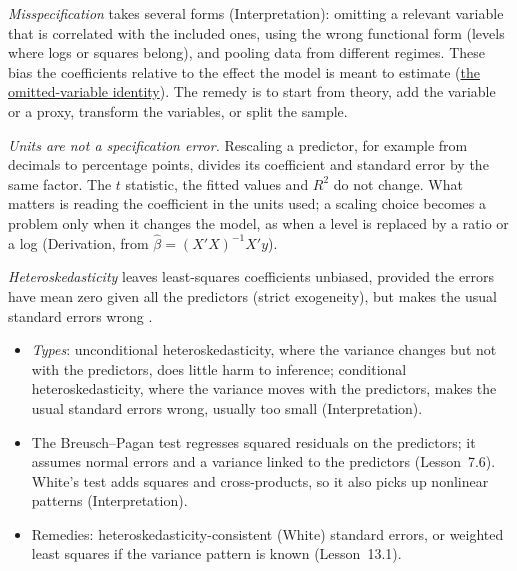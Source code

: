 \begin{qfmethod}\label{meth:regression-misspecification}
 \emph{Misspecification} takes several forms (Interpretation): omitting a relevant variable that is correlated with the included ones, using the wrong functional form (levels where logs or squares belong), and pooling data from different regimes. These bias the coefficients relative to the effect the model is meant to estimate (\hyperref[meth:multiple-regression-formulation]{the omitted-variable identity}). The remedy is to start from theory, add the variable or a proxy, transform the variables, or split the sample.

\emph{Units are not a specification error.} Rescaling a predictor, for example from decimals to percentage points, divides its coefficient and standard error by the same factor. The $t$ statistic, the fitted values and $R^2$ do not change. What matters is reading the coefficient in the units used; a scaling choice becomes a problem only when it changes the model, as when a level is replaced by a ratio or a log (Derivation, from $\hat\beta=(X'X)^{-1}X'y$).

\emph{Heteroskedasticity} leaves least-squares coefficients unbiased, provided the errors have mean zero given all the predictors (strict exogeneity), but makes the usual standard errors wrong \citep[Lessons~7.6, 13.1]{regression-methods-course-notes}.
\begin{itemize}
\item \emph{Types}: unconditional heteroskedasticity, where the variance changes but not with the predictors, does little harm to inference; conditional heteroskedasticity, where the variance moves with the predictors, makes the usual standard errors wrong, usually too small (Interpretation).
\item The Breusch--Pagan test regresses squared residuals on the predictors; it assumes normal errors and a variance linked to the predictors (Lesson~7.6). White's test adds squares and cross-products, so it also picks up nonlinear patterns (Interpretation).
\item Remedies: heteroskedasticity-consistent (White) standard errors, or weighted least squares if the variance pattern is known (Lesson~13.1).
\end{itemize}


\end{qfmethod}
